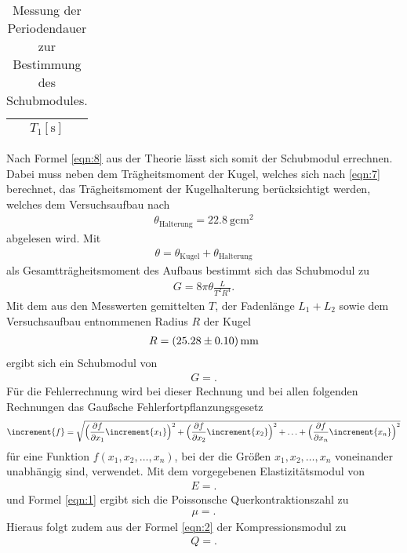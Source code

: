 \begin{table}[H]
  \centering
  \caption{Messung der Periodendauer zur Bestimmung des Schubmodules.}
  \label{tab:3}
  \begin{tabular}{c}
    \toprule
    {$T_1 [\si{\second}]$}\\
    \midrule
    
    \bottomrule
  \end{tabular}
\end{table}

Nach Formel \eqref{eqn:8} aus der Theorie lässt sich somit der Schubmodul errechnen.
Dabei muss neben dem Trägheitsmoment der Kugel, welches sich nach \eqref{eqn:7} berechnet, das Trägheitsmoment der Kugelhalterung berücksichtigt werden, welches dem Versuchsaufbau nach
\begin{align*}
  \theta_{\text{Halterung}} = \SI{22.8}{\gram\centi\metre\squared}
\end{align*}
abgelesen wird.
Mit
\begin{align*}
  \theta = \theta_{\text{Kugel}} + \theta_{\text{Halterung}}
\end{align*}
als Gesamtträgheitsmoment des Aufbaus bestimmt sich das Schubmodul zu
\begin{align*}
  G = 8 \pi \theta \frac{L}{T^2 R^4}.
\end{align*}
Mit dem aus den Messwerten gemittelten $T$, der Fadenlänge $L_1 + L_2$ sowie dem Versuchsaufbau entnommenen Radius $R$ der Kugel
\begin{align*}
  R = \SI{25.28 +- 0.1}{\milli\metre}
\end{align*}
ergibt sich ein Schubmodul von
\begin{align*}
  G = .
\end{align*}
Für die Fehlerrechnung wird bei dieser Rechnung und bei allen folgenden Rechnungen das Gaußsche Fehlerfortpflanzungsgesetz
\begin{equation}
\increment{f} = \sqrt{\Bigl(\frac{\partial f}{\partial x_1}\increment{x_1}\Bigr)^2 + \Bigl(\frac{\partial f}{\partial x_2}\increment{x_2}\Bigr)^2 + \dotsc + \Bigl(\frac{\partial f}{\partial x_n}\increment{x_n}\Bigr)^2}
\end{equation}
für eine Funktion $f(x_1,x_2, \dotsc ,x_n)$, bei der die Größen $x_1, x_2, \dotsc , x_n$ voneinander unabhängig sind, verwendet.
Mit dem vorgegebenen Elastizitätsmodul von
\begin{align*}
  E = .
\end{align*}
und Formel \eqref{eqn:1} ergibt sich die Poissonsche Querkontraktionszahl zu
\begin{align*}
  \mu = .
\end{align*}
Hieraus folgt zudem aus der Formel \eqref{eqn:2} der Kompressionsmodul zu
\begin{align*}
  Q = .
\end{align*}

